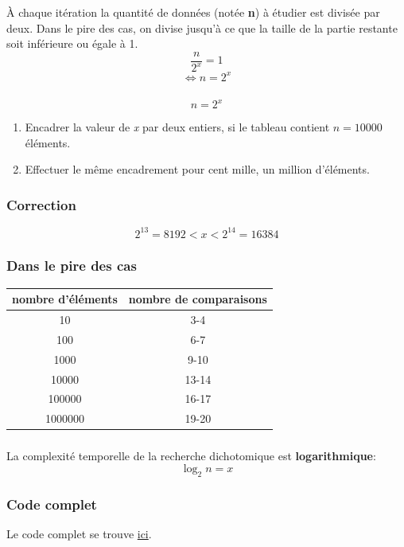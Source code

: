 \documentclass[svgnames,11pt]{beamer}
\begin{document}
\begin{frame}
    \frametitle{}
    À chaque itération la quantité de données (notée \textbf{n}) à étudier est divisée par deux. Dans le pire des cas, on divise jusqu'à ce que la taille de la partie restante soit inférieure ou égale à 1.
    {\Large$$\dfrac{n}{2^x}=1$$
    $$\Leftrightarrow n=2^x$$}
    

\end{frame}
\begin{frame}
    \frametitle{}
    {\Large$$n=2^x$$}
    \begin{activite}
        \begin{enumerate}
            \item Encadrer la valeur de \emph{x} par deux entiers, si le tableau contient $n=10000$ éléments.
            \item Effectuer le même encadrement pour cent mille, un million d'éléments.
        \end{enumerate}
        \end{activite}

\end{frame}
\begin{frame}
    \frametitle{Correction}

    {\Large $$2^{13}=8192 < x < 2^{14}=16384$$}

\end{frame}
\begin{frame}
    \frametitle{Dans le pire des cas}

    \begin{center}
        \begin{tabular}{|c|c|}
            \hline
            nombre d'éléments&nombre de comparaisons\\
            \hline
            10&3-4\\
            100&6-7\\
            1000&9-10\\
            10000&13-14\\
            100000&16-17\\
            1000000&19-20\\
            \hline
        \end{tabular}
    \end{center}

\end{frame}
\begin{frame}
    \frametitle{}

    \begin{aretenir}[]
        La complexité temporelle de la recherche dichotomique est \textbf{logarithmique}:
        {\Large$$ \log_2{n} =x$$}
        \end{aretenir}
\end{frame}
\begin{frame}
    \frametitle{Code complet}

    Le code complet se trouve \href{https://cviroulaud.github.io/premiere/algorithmique/recherche-dichotomique/scripts/dicho.zip}{ici}.

\end{frame}
\end{document}
